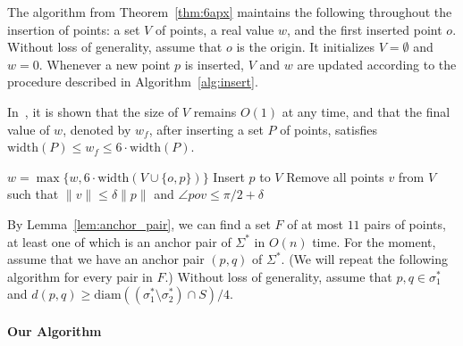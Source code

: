\documentclass[10pt,a4paper]{article}
\theoremstyle{star}
\theoremstyle{claimstar}
\newcommand{\diam}{\ensuremath{\mathrm{diam}}}
\newcommand{\width}{\ensuremath{\mathrm{width}}}
\begin{document}
\sixapx*




The algorithm from Theorem~\ref{thm:6apx} maintains the following throughout the insertion of points: a set $V$ of points, a real value $w$, and the first inserted point $o$.
Without loss of generality, assume that $o$ is the origin.
It initializes $V = \emptyset$ and $w = 0$.
Whenever a new point $p$ is inserted, $V$ and $w$ are updated according to the procedure described in Algorithm~\ref{alg:insert}.

In~\cite{chan2006faster}, it is shown that the size of $V$ remains $O(1)$ at any time, and that the final value of $w$, denoted by $w_f$, after inserting a set $P$ of points, satisfies $\width(P) \le w_f \le 6 \cdot \width(P)$.


\begin{algorithm}
\caption{Processing a new point $p$ (See the proof of Theorem A.3 in \cite{chan2006faster}. Let $\delta>0$ be a sufficiently small constant.)}
\label{alg:insert}
\begin{algorithmic}[1]
\State $w = \max \{w, 6\cdot \width(V \cup \{ o, p\} ) \}$ 
    \State Insert $p$ to $V$
    \State Remove all points $v$ from $V$ such that $\|v\| \le \delta \|p\|$ and $\angle pov \le \pi/2 + \delta$
\EndIf
\EndFunction
\end{algorithmic}
\end{algorithm}


\medbreak
By Lemma~\ref{lem:anchor_pair}, we can find a set $F$ of at most $11$ pairs of points, at least one of which is an anchor pair of $\Sigma^*$ in $O(n)$ time. 
For the moment, assume that we have an anchor pair $(p, q)$ of $\Sigma^*$. (We will repeat the following algorithm for every pair in $F$.)
Without loss of generality, assume that $p, q \in \sigma_1^*$ and $d(p, q) \ge \diam((\sigma_1^*\setminus \sigma_2^* ) \cap S)/4$. 







\paragraph*{Our Algorithm}




\end{document}
